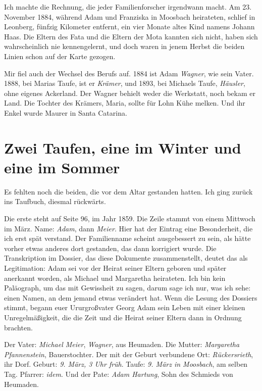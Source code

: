 \documentclass[
  ngerman,
  11pt,
  openany]{book}
\begin{document}
Ich machte die Rechnung, die jeder Familienforscher irgendwann macht. Am
23. November 1884, während Adam und Franziska in Moosbach heirateten,
schlief in Leonberg, fünfzig Kilometer entfernt, ein vier Monate altes
Kind namens Johann Haas. Die Eltern des Fata und die Eltern der Mota
kannten sich nicht, haben sich wahrscheinlich nie kennengelernt, und
doch waren in jenem Herbst die beiden Linien schon auf der Karte
gezogen.

Mir fiel auch der Wechsel des Berufs auf. 1884 ist Adam \emph{Wagner},
wie sein Vater. 1888, bei Marias Taufe, ist er \emph{Krämer}, und 1893,
bei Michaels Taufe, \emph{Häusler}, ohne eigenes Ackerland. Der Wagner
behielt weder die Werkstatt, noch bekam er Land. Die Tochter des
Krämers, Maria, sollte für Lohn Kühe melken. Und ihr Enkel wurde Maurer
in Santa Catarina.

\section{Zwei Taufen, eine im Winter und eine im
Sommer}\label{zwei-taufen-eine-im-winter-und-eine-im-sommer}

Es fehlten noch die beiden, die vor dem Altar gestanden hatten. Ich ging
zurück ins Taufbuch, diesmal rückwärts.

Die erste steht auf Seite 96, im Jahr 1859. Die Zeile stammt von einem
Mittwoch im März. Name: \emph{Adam}, dann \emph{Meier}. Hier hat der
Eintrag eine Besonderheit, die ich erst spät verstand. Der Familienname
scheint ausgebessert zu sein, als hätte vorher etwas anderes dort
gestanden, das dann korrigiert wurde. Die Transkription im Dossier, das
diese Dokumente zusammenstellt, deutet das als Legitimation: Adam sei
vor der Heirat seiner Eltern geboren und später anerkannt worden, als
Michael und Margaretha heirateten. Ich bin kein Paläograph, um das mit
Gewissheit zu sagen, darum sage ich nur, was ich sehe: einen Namen, an
dem jemand etwas verändert hat. Wenn die Lesung des Dossiers stimmt,
begann euer Ururgroßvater Georg Adam sein Leben mit einer kleinen
Unregelmäßigkeit, die die Zeit und die Heirat seiner Eltern dann in
Ordnung brachten.

Der Vater: \emph{Michael Meier}, \emph{Wagner}, aus Heumaden. Die
Mutter: \emph{Margaretha Pfannenstein}, Bauerstochter. Der mit der
Geburt verbundene Ort: \emph{Rückersrieth}, ihr Dorf. Geburt: \emph{9.
März, 3 Uhr früh}. Taufe: \emph{9. März in Moosbach}, am selben Tag.
Pfarrer: \emph{idem}. Und der Pate: \emph{Adam Hartung}, Sohn des
Schmieds von Heumaden.
\end{document}

